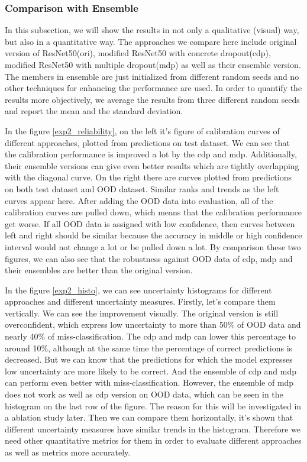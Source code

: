 \subsubsection{Comparison with Ensemble}
In this subsection, we will show the results in not only a qualitative (visual) way, but also in a quantitative way. The approaches we compare here include original version of ResNet50(ori), modified ResNet50 with concrete dropout(cdp), modified ResNet50 with multiple dropout(mdp) as well as their ensemble version. The members in ensemble are just initialized from different random seeds and no other techniques for enhancing the performance are used. In order to quantify the results more objectively, we average the results from three different random seeds and report the mean and the standard deviation.

In the figure \ref{exp2_reliability}, on the left it's figure of calibration curves of different approaches, plotted from predictions on test dataset. We can see that the calibration performance is improved a lot by the cdp and mdp. Additionally, their ensemble versions can give even better results which are tightly overlapping with the diagonal curve. On the right there are curves plotted from predictions on both test dataset and OOD dataset. Similar ranks and trends as the left curves appear here. After adding the OOD data into evaluation, all of the calibration curves are pulled down, which means that the calibration performance get worse. If all OOD data is assigned with low confidence, then curves between left and right should be similar because the accuracy in middle or high confidence interval would not change a lot or be pulled down a lot. By comparison these two figures, we can also see that the robustness against OOD data of cdp, mdp and their ensembles are better than the original version.

In the figure \ref{exp2_histo}, we can see uncertainty histograms for different approaches and different uncertainty measures. Firstly, let's compare them vertically. We can see the improvement visually. The original version is still overconfident, which express low uncertainty to more than 50$\%$ of OOD data and nearly 40\% of miss-classification. The  cdp and mdp can lower this percentage to around 10\%, although at the same time the percentage of correct predictions is decreased. But we can know that the predictions for which the model expresses low uncertainty are more likely to be correct. And the ensemble of cdp and mdp can perform even better with miss-classification. However, the ensemble of mdp does not work as well as cdp version on OOD data, which can be seen in the histogram on the last row of the figure. The reason for this will be investigated in a ablation study later. Then we can compare them horizontally, it's shown that different uncertainty measures have similar trends in the histogram. Therefore we need other quantitative metrics for them in order to evaluate different approaches as well as metrics more accurately.  


